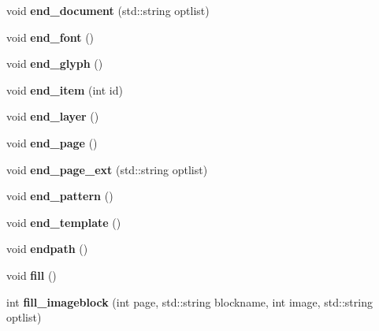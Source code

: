 \begin{DoxyCompactItemize}
\item 
\hypertarget{classPDFlib_aadbf95532d240e683aeda234624c7f61}{}\label{classPDFlib_aadbf95532d240e683aeda234624c7f61} 
void {\bfseries end\+\_\+document} (std\+::string optlist)
\item 
\hypertarget{classPDFlib_ad38e3338e0217a90ff322083b7d66843}{}\label{classPDFlib_ad38e3338e0217a90ff322083b7d66843} 
void {\bfseries end\+\_\+font} ()
\item 
\hypertarget{classPDFlib_a75da9905bdccda79115aa724a7aff2bd}{}\label{classPDFlib_a75da9905bdccda79115aa724a7aff2bd} 
void {\bfseries end\+\_\+glyph} ()
\item 
\hypertarget{classPDFlib_a1052c7d1cb2993e32341718e9c36c30c}{}\label{classPDFlib_a1052c7d1cb2993e32341718e9c36c30c} 
void {\bfseries end\+\_\+item} (int id)
\item 
\hypertarget{classPDFlib_a485ab7dd0996da8194e768e1c97eed21}{}\label{classPDFlib_a485ab7dd0996da8194e768e1c97eed21} 
void {\bfseries end\+\_\+layer} ()
\item 
\hypertarget{classPDFlib_ad155354f3b07ccf69bc82000211a4018}{}\label{classPDFlib_ad155354f3b07ccf69bc82000211a4018} 
void {\bfseries end\+\_\+page} ()
\item 
\hypertarget{classPDFlib_aaeb1219f151a8b54e2c02e4e4633856b}{}\label{classPDFlib_aaeb1219f151a8b54e2c02e4e4633856b} 
void {\bfseries end\+\_\+page\+\_\+ext} (std\+::string optlist)
\item 
\hypertarget{classPDFlib_ac7a93102d044e6c8bd06d2a83c6b66f7}{}\label{classPDFlib_ac7a93102d044e6c8bd06d2a83c6b66f7} 
void {\bfseries end\+\_\+pattern} ()
\item 
\hypertarget{classPDFlib_a67057f952266b4cbdd737b61a85090f7}{}\label{classPDFlib_a67057f952266b4cbdd737b61a85090f7} 
void {\bfseries end\+\_\+template} ()
\item 
\hypertarget{classPDFlib_a7d53283bf3787237ca080b1ee6897a26}{}\label{classPDFlib_a7d53283bf3787237ca080b1ee6897a26} 
void {\bfseries endpath} ()
\item 
\hypertarget{classPDFlib_a0a698c3eb4f96ec63cf9636074fd7870}{}\label{classPDFlib_a0a698c3eb4f96ec63cf9636074fd7870} 
void {\bfseries fill} ()
\item 
\hypertarget{classPDFlib_a584ee614b174cc35d99f0571227df21a}{}\label{classPDFlib_a584ee614b174cc35d99f0571227df21a} 
int {\bfseries fill\+\_\+imageblock} (int page, std\+::string blockname, int image, std\+::string optlist)
\item 
\hypertarget{classPDFlib_af9c0c51770f3296907a630314f04dd03}{}\label{classPDFlib_af9c0c51770f3296907a630314f04dd03} 

\end{DoxyCompactItemize}

